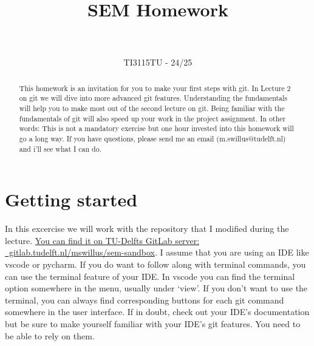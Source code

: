 \documentclass[12pt]{article}
\title{SEM Homework\\ \faGit*~\faGit}
\date{TI3115TU - 24/25}
\begin{document}
\markboth{}{\thetitle}

\maketitle


\begin{abstract}
    This homework is an invitation for you to make your first
    steps with git.
    In Lecture 2 on git we will dive into more advanced git features.
    Understanding the fundamentals
    will help you
    to make most out of the second lecture on git.
    Being familiar with the fundamentals of git
    will also speed up your work in the project assignment.
    In other words:
    This is not a mandatory exercise but one hour invested
    into this homework will go a long way.
    If you have questions,
    please send me an email (m.swillus@tudelft.nl)
    and i'll see what I can do.
\end{abstract}

\section{Getting started}
In this excercise we will work with
the repository that I modified during the lecture.
\href{https://gitlab.tudelft.nl/mswillus/sem-sandbox/}{
You can find it on TU-Delfts GitLab server: \faGitlab~gitlab.tudelft.nl/mswillus/sem-sandbox}.
I assume that you are using an IDE like vscode or pycharm.
If you do want to follow along with terminal commands,
you can use the terminal feature of your IDE.
In vscode you can find the terminal option somewhere in the menu, usually under `view'.
If you don't want to use the terminal,
you can always find corresponding buttons for each git command somewhere in the user interface.
If in doubt, check out your IDE's documentation
but be sure to make yourself familiar with your IDE's git features.
You need to be able to rely on them.
\end{document}
